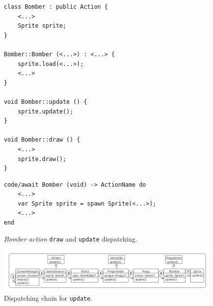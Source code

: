 \documentclass[10pt, conference, compsocconf]{IEEEtran}
\newcommand{\CEU}{\textsc{C\'{e}u}\xspace}
\newcommand{\code}[1] {{\small{\texttt{#1}}}}
\newcommand{\ax}{\code{[a]}\xspace}
\newcommand{\bx}{\code{[b]}\xspace}
\begin{document}
\begin{figure}[t]
\begin{lstlisting}[numbers=right]
class Bomber : public Action {
    <...>
    Sprite sprite;
}

Bomber::Bomber (<...>) : <...> {
    sprite.load(<...>);
    <...>
}

void Bomber::update () {
    sprite.update();
}

void Bomber::draw () {
    <...>
    sprite.draw();
}
\end{lstlisting}
\end{figure}
%
\begin{figure}[t]
\begin{lstlisting}[xleftmargin=2em]
code/await Bomber (void) -> ActionName do
    <...>
    var Sprite sprite = spawn Sprite(<...>);
    <...>
end
\end{lstlisting}
\caption{ \emph{Bomber action} \code{draw} and \code{update} dispatching.
\label{lst.hier}
}
\end{figure}

\begin{figure}
\centering
\includegraphics[width=\textwidth]{hierarchy}
\caption{Dispatching chain for \code{update}.
\label{fig.hier}
}
\end{figure}
\end{document}
